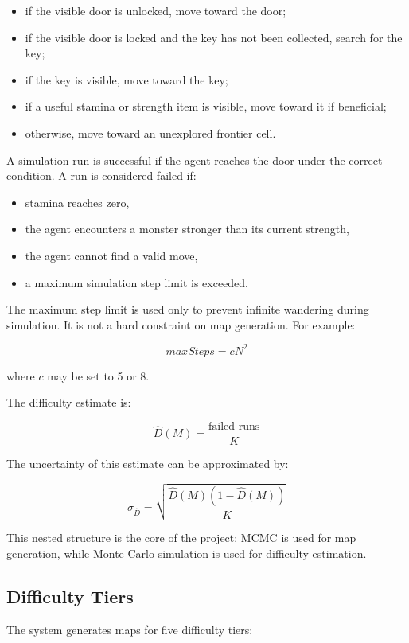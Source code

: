 \documentclass[11pt]{article}
\begin{document}
\begin{itemize}[noitemsep]
    \item if the visible door is unlocked, move toward the door;
    \item if the visible door is locked and the key has not been collected, search for the key;
    \item if the key is visible, move toward the key;
    \item if a useful stamina or strength item is visible, move toward it if beneficial;
    \item otherwise, move toward an unexplored frontier cell.
\end{itemize}

A simulation run is successful if the agent reaches the door under the correct condition. A run is considered failed if:

\begin{itemize}[noitemsep]
    \item stamina reaches zero,
    \item the agent encounters a monster stronger than its current strength,
    \item the agent cannot find a valid move,
    \item a maximum simulation step limit is exceeded.
\end{itemize}

The maximum step limit is used only to prevent infinite wandering during simulation. It is not a hard constraint on map generation. For example:

\[
maxSteps = cN^2
\]

where $c$ may be set to 5 or 8.

The difficulty estimate is:

\[
\hat{D}(M) =
\frac{\text{failed runs}}{K}
\]

The uncertainty of this estimate can be approximated by:

\[
\sigma_{\hat{D}} =
\sqrt{
\frac{\hat{D}(M)(1-\hat{D}(M))}{K}
}
\]

This nested structure is the core of the project: MCMC is used for map generation, while Monte Carlo simulation is used for difficulty estimation.

\subsection{Difficulty Tiers}

The system generates maps for five difficulty tiers:
\end{document}
